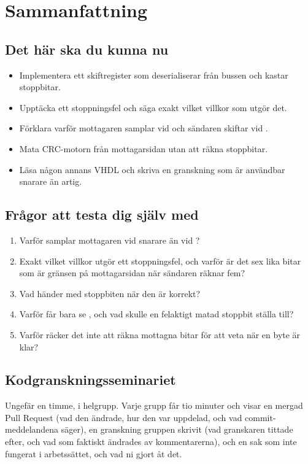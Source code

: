 
\section{Sammanfattning}
\label{c15:sec:review}

\subsection*{Det här ska du kunna nu}
\begin{itemize}
  \item Implementera ett skiftregister som deserialiserar från bussen och kastar stoppbitar.
  \item Upptäcka ett stoppningsfel och säga exakt vilket villkor som utgör det.
  \item Förklara varför mottagaren samplar vid  och sändaren skiftar vid
    .
  \item Mata CRC-motorn från mottagarsidan utan att räkna stoppbitar.
  \item Läsa någon annans VHDL och skriva en granskning som är användbar snarare än artig.
\end{itemize}

\subsection*{Frågor att testa dig själv med}
\begin{enumerate}
  \item Varför samplar mottagaren vid  snarare än vid ?
  \item Exakt vilket villkor utgör ett stoppningsfel, och varför är det sex lika bitar som är
    gränsen på mottagarsidan när sändaren räknar fem?
  \item Vad händer med stoppbiten när den är korrekt?
  \item Varför får  bara se , och vad skulle en felaktigt matad stoppbit
    ställa till?
  \item Varför räcker det inte att räkna mottagna bitar för att veta när en byte är klar?
\end{enumerate}

\subsection*{Kodgranskningsseminariet}
Ungefär en timme, i helgrupp. Varje grupp får tio minuter och visar en mergad Pull Request (vad den
ändrade, hur den var uppdelad, och vad commit-meddelandena säger), en granskning gruppen skrivit
(vad granskaren tittade efter, och vad som faktiskt ändrades av kommentarerna), och en sak som inte
fungerat i arbetssättet, och vad ni gjort åt det.

